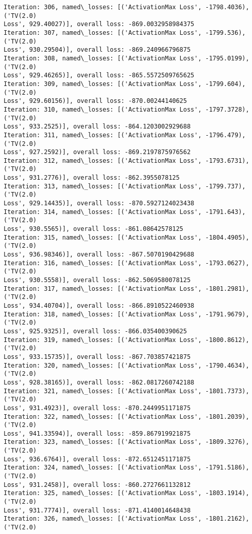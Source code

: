 \documentclass[10pt]{article}
\begin{document}
\begin{Verbatim}[commandchars=\\\{\}]
Iteration: 306, named\_losses: [('ActivationMax Loss', -1798.4036), ('TV(2.0)
Loss', 929.40027)], overall loss: -869.0032958984375
Iteration: 307, named\_losses: [('ActivationMax Loss', -1799.536), ('TV(2.0)
Loss', 930.29504)], overall loss: -869.240966796875
Iteration: 308, named\_losses: [('ActivationMax Loss', -1795.0199), ('TV(2.0)
Loss', 929.46265)], overall loss: -865.5572509765625
Iteration: 309, named\_losses: [('ActivationMax Loss', -1799.604), ('TV(2.0)
Loss', 929.60156)], overall loss: -870.00244140625
Iteration: 310, named\_losses: [('ActivationMax Loss', -1797.3728), ('TV(2.0)
Loss', 933.2525)], overall loss: -864.1203002929688
Iteration: 311, named\_losses: [('ActivationMax Loss', -1796.479), ('TV(2.0)
Loss', 927.2592)], overall loss: -869.2197875976562
Iteration: 312, named\_losses: [('ActivationMax Loss', -1793.6731), ('TV(2.0)
Loss', 931.2776)], overall loss: -862.3955078125
Iteration: 313, named\_losses: [('ActivationMax Loss', -1799.737), ('TV(2.0)
Loss', 929.14435)], overall loss: -870.5927124023438
Iteration: 314, named\_losses: [('ActivationMax Loss', -1791.643), ('TV(2.0)
Loss', 930.5565)], overall loss: -861.08642578125
Iteration: 315, named\_losses: [('ActivationMax Loss', -1804.4905), ('TV(2.0)
Loss', 936.98346)], overall loss: -867.5070190429688
Iteration: 316, named\_losses: [('ActivationMax Loss', -1793.0627), ('TV(2.0)
Loss', 930.5558)], overall loss: -862.5069580078125
Iteration: 317, named\_losses: [('ActivationMax Loss', -1801.2981), ('TV(2.0)
Loss', 934.40704)], overall loss: -866.8910522460938
Iteration: 318, named\_losses: [('ActivationMax Loss', -1791.9679), ('TV(2.0)
Loss', 925.9325)], overall loss: -866.035400390625
Iteration: 319, named\_losses: [('ActivationMax Loss', -1800.8612), ('TV(2.0)
Loss', 933.15735)], overall loss: -867.703857421875
Iteration: 320, named\_losses: [('ActivationMax Loss', -1790.4634), ('TV(2.0)
Loss', 928.38165)], overall loss: -862.0817260742188
Iteration: 321, named\_losses: [('ActivationMax Loss', -1801.7373), ('TV(2.0)
Loss', 931.4923)], overall loss: -870.2449951171875
Iteration: 322, named\_losses: [('ActivationMax Loss', -1801.2039), ('TV(2.0)
Loss', 941.33594)], overall loss: -859.867919921875
Iteration: 323, named\_losses: [('ActivationMax Loss', -1809.3276), ('TV(2.0)
Loss', 936.6764)], overall loss: -872.6512451171875
Iteration: 324, named\_losses: [('ActivationMax Loss', -1791.5186), ('TV(2.0)
Loss', 931.2458)], overall loss: -860.2727661132812
Iteration: 325, named\_losses: [('ActivationMax Loss', -1803.1914), ('TV(2.0)
Loss', 931.7774)], overall loss: -871.4140014648438
Iteration: 326, named\_losses: [('ActivationMax Loss', -1801.2162), ('TV(2.0)

\end{Verbatim}
\end{document}
